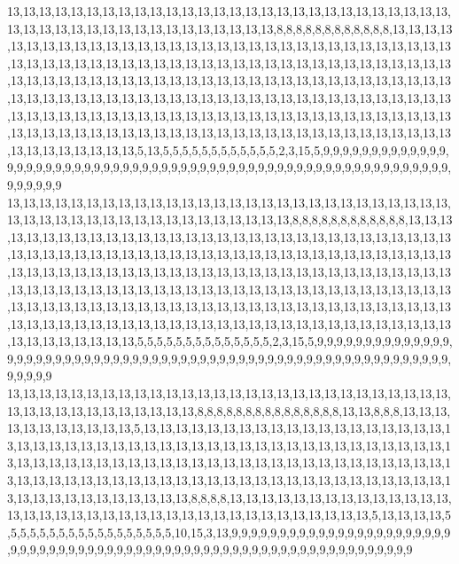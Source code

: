 13,13,13,13,13,13,13,13,13,13,13,13,13,13,13,13,13,13,13,13,13,13,13,13,13,13,13,13,13,13,13,13,13,13,13,13,13,13,13,13,13,13,13,13,13,8,8,8,8,8,8,8,8,8,8,8,8,13,13,13,13,13,13,13,13,13,13,13,13,13,13,13,13,13,13,13,13,13,13,13,13,13,13,13,13,13,13,13,13,13,13,13,13,13,13,13,13,13,13,13,13,13,13,13,13,13,13,13,13,13,13,13,13,13,13,13,13,13,13,13,13,13,13,13,13,13,13,13,13,13,13,13,13,13,13,13,13,13,13,13,13,13,13,13,13,13,13,13,13,13,13,13,13,13,13,13,13,13,13,13,13,13,13,13,13,13,13,13,13,13,13,13,13,13,13,13,13,13,13,13,13,13,13,13,13,13,13,13,13,13,13,13,13,13,13,13,13,13,13,13,13,13,13,13,13,13,13,13,13,13,13,13,13,13,13,13,13,13,13,13,13,13,13,13,13,13,13,13,13,13,13,13,13,13,13,13,13,5,13,5,5,5,5,5,5,5,5,5,5,5,5,2,3,15,5,9,9,9,9,9,9,9,9,9,9,9,9,9,9,9,9,9,9,9,9,9,9,9,9,9,9,9,9,9,9,9,9,9,9,9,9,9,9,9,9,9,9,9,9,9,9,9,9,9,9,9,9,9,9,9,9,9,9,9,9,9,9,9,9,9
13,13,13,13,13,13,13,13,13,13,13,13,13,13,13,13,13,13,13,13,13,13,13,13,13,13,13,13,13,13,13,13,13,13,13,13,13,13,13,13,13,13,13,13,13,13,8,8,8,8,8,8,8,8,8,8,8,8,13,13,13,13,13,13,13,13,13,13,13,13,13,13,13,13,13,13,13,13,13,13,13,13,13,13,13,13,13,13,13,13,13,13,13,13,13,13,13,13,13,13,13,13,13,13,13,13,13,13,13,13,13,13,13,13,13,13,13,13,13,13,13,13,13,13,13,13,13,13,13,13,13,13,13,13,13,13,13,13,13,13,13,13,13,13,13,13,13,13,13,13,13,13,13,13,13,13,13,13,13,13,13,13,13,13,13,13,13,13,13,13,13,13,13,13,13,13,13,13,13,13,13,13,13,13,13,13,13,13,13,13,13,13,13,13,13,13,13,13,13,13,13,13,13,13,13,13,13,13,13,13,13,13,13,13,13,13,13,13,13,13,13,13,13,13,13,13,13,13,13,13,13,13,13,13,13,13,13,5,5,5,5,5,5,5,5,5,5,5,5,5,5,2,3,15,5,9,9,9,9,9,9,9,9,9,9,9,9,9,9,9,9,9,9,9,9,9,9,9,9,9,9,9,9,9,9,9,9,9,9,9,9,9,9,9,9,9,9,9,9,9,9,9,9,9,9,9,9,9,9,9,9,9,9,9,9,9,9,9,9,9
13,13,13,13,13,13,13,13,13,13,13,13,13,13,13,13,13,13,13,13,13,13,13,13,13,13,13,13,13,13,13,13,13,13,13,13,13,13,13,13,8,8,8,8,8,8,8,8,8,8,8,8,8,8,8,13,13,8,8,8,13,13,13,13,13,13,13,13,13,13,13,5,13,13,13,13,13,13,13,13,13,13,13,13,13,13,13,13,13,13,13,13,13,13,13,13,13,13,13,13,13,13,13,13,13,13,13,13,13,13,13,13,13,13,13,13,13,13,13,13,13,13,13,13,13,13,13,13,13,13,13,13,13,13,13,13,13,13,13,13,13,13,13,13,13,13,13,13,13,13,13,13,13,13,13,13,13,13,13,13,13,13,13,13,13,13,13,13,13,13,13,13,13,13,13,13,13,13,13,13,13,13,13,13,13,13,13,8,8,8,8,13,13,13,13,13,13,13,13,13,13,13,13,13,13,13,13,13,13,13,13,13,13,13,13,13,13,13,13,13,13,13,13,13,13,13,13,13,5,13,13,13,13,5,5,5,5,5,5,5,5,5,5,5,5,5,5,5,5,5,5,10,15,3,13,9,9,9,9,9,9,9,9,9,9,9,9,9,9,9,9,9,9,9,9,9,9,9,9,9,9,9,9,9,9,9,9,9,9,9,9,9,9,9,9,9,9,9,9,9,9,9,9,9,9,9,9,9,9,9,9,9,9,9,9,9,9,9,9,9
